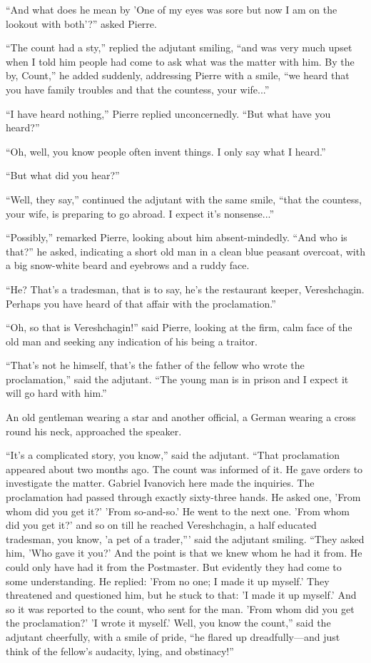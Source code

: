 ``And what does he mean by 'One of my eyes was sore but now I am
on the lookout with both'?'' asked Pierre.

``The count had a sty,'' replied the adjutant smiling, ``and was
very much upset when I told him people had come to ask what was
the matter with him. By the by, Count,'' he added suddenly,
addressing Pierre with a smile, ``we heard that you have family
troubles and that the countess, your wife...''

``I have heard nothing,'' Pierre replied unconcernedly. ``But
what have you heard?''

``Oh, well, you know people often invent things. I only say what
I heard.''

``But what did you hear?''

``Well, they say,'' continued the adjutant with the same smile,
``that the countess, your wife, is preparing to go abroad. I
expect it's nonsense...''

``Possibly,'' remarked Pierre, looking about him
absent-mindedly. ``And who is that?'' he asked, indicating a
short old man in a clean blue peasant overcoat, with a big
snow-white beard and eyebrows and a ruddy face.

``He? That's a tradesman, that is to say, he's the restaurant
keeper, Vereshchagin. Perhaps you have heard of that affair with
the proclamation.''

``Oh, so that is Vereshchagin!'' said Pierre, looking at the
firm, calm face of the old man and seeking any indication of his
being a traitor.

``That's not he himself, that's the father of the fellow who
wrote the proclamation,'' said the adjutant. ``The young man is
in prison and I expect it will go hard with him.''

An old gentleman wearing a star and another official, a German
wearing a cross round his neck, approached the speaker.

``It's a complicated story, you know,'' said the adjutant. ``That
proclamation appeared about two months ago. The count was
informed of it. He gave orders to investigate the matter. Gabriel
Ivanovich here made the inquiries. The proclamation had passed
through exactly sixty-three hands. He asked one, 'From whom did
you get it?' 'From so-and-so.'  He went to the next one. 'From
whom did you get it?' and so on till he reached Vereshchagin, a
half educated tradesman, you know, 'a pet of a trader,''' said
the adjutant smiling. ``They asked him, 'Who gave it you?'  And
the point is that we knew whom he had it from. He could only have
had it from the Postmaster. But evidently they had come to some
understanding. He replied: 'From no one; I made it up myself.'
They threatened and questioned him, but he stuck to that: 'I made
it up myself.' And so it was reported to the count, who sent for
the man.  'From whom did you get the proclamation?' 'I wrote it
myself.' Well, you know the count,'' said the adjutant
cheerfully, with a smile of pride, ``he flared up
dreadfully---and just think of the fellow's audacity, lying, and
obstinacy!''

